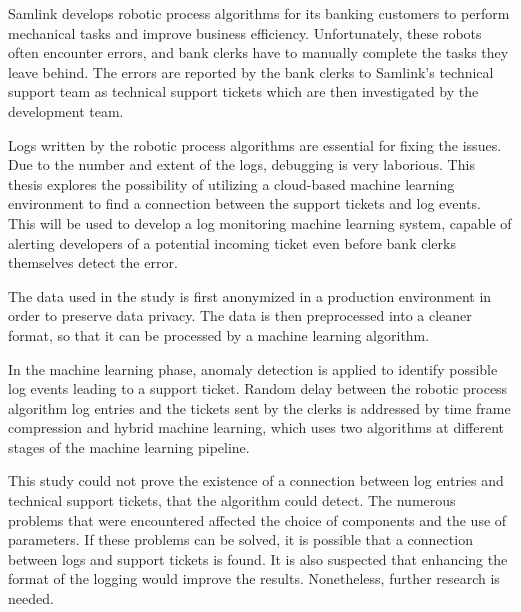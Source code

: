 \documentclass[english, 12pt, a4paper, elec, utf8, a-1b, online]{aaltothesis}
\date{01.08.2022}
\begin{document}
\makecoverpage

\makecopyrightpage


\begin{abstractpage}[english]
      Samlink develops robotic process algorithms for its banking customers
      to perform mechanical tasks and improve business efficiency.
      Unfortunately, these robots often encounter errors,
      and bank clerks have to manually complete
      the tasks they leave behind.
      The errors are reported by the bank clerks to Samlink's technical support team
      as technical support tickets which are then investigated by the development team.

      Logs written by the robotic process algorithms are essential for fixing the issues.
      Due to the number and extent of the logs,
      debugging is very laborious.
      This thesis explores the possibility of
      utilizing a cloud-based machine learning environment
      to find a connection between the support tickets and log events.
      This will be used to develop a log monitoring machine learning system,
      capable of alerting developers of a potential incoming ticket
      even before bank clerks themselves detect the error.

      The data used in the study is first anonymized in a production environment
      in order to preserve data privacy.
      The data is then preprocessed into a cleaner format,
      so that it can be processed by a machine learning algorithm.

      In the machine learning phase, anomaly detection is applied
      to identify possible log events leading to a support ticket.
      Random delay between the robotic process algorithm log entries and the tickets sent by the clerks
      is addressed by time frame compression and hybrid machine learning,
      which uses two algorithms at different stages of the machine learning pipeline.

      This study could not prove the existence of a connection
      between log entries and technical support tickets,
      that the algorithm could detect.
      The numerous problems that were encountered affected the choice of components
      and the use of parameters.
      If these problems can be solved,
      it is possible that a connection between logs and support tickets is found.
      It is also suspected that enhancing the format of the logging would improve the results.
      Nonetheless, further research is needed.
\end{abstractpage}
\end{document}
